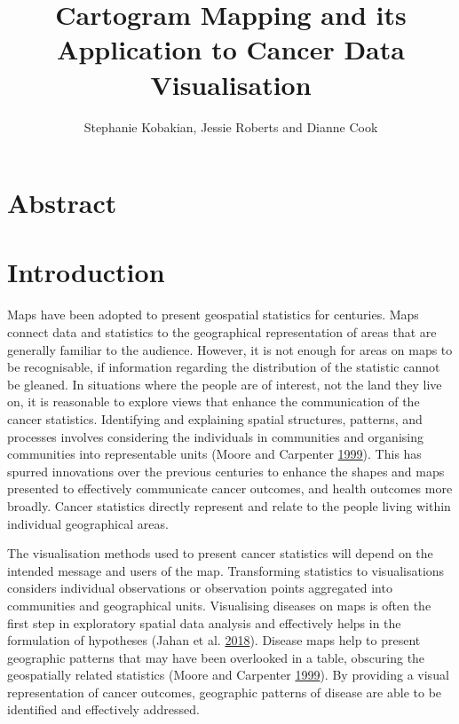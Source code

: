 \documentclass[11pt,]{article}
\title{Cartogram Mapping and its Application to Cancer Data Visualisation}
\author{Stephanie Kobakian, Jessie Roberts and Dianne Cook}
\date{}
\begin{document}
\maketitle

{
\setcounter{tocdepth}{2}
\tableofcontents
}
\section*{Abstract}

\hypertarget{introduction}{%
\section{Introduction}\label{introduction}}

Maps have been adopted to present geospatial statistics for centuries.
Maps connect data and statistics to the geographical representation of
areas that are generally familiar to the audience. However, it is not
enough for areas on maps to be recognisable, if information regarding
the distribution of the statistic cannot be gleaned. In situations where
the people are of interest, not the land they live on, it is reasonable
to explore views that enhance the communication of the cancer
statistics. Identifying and explaining spatial structures, patterns, and
processes involves considering the individuals in communities and
organising communities into representable units (Moore and Carpenter
\protect\hyperlink{ref-SAMGIS}{1999}). This has spurred innovations over
the previous centuries to enhance the shapes and maps presented to
effectively communicate cancer outcomes, and health outcomes more
broadly. Cancer statistics directly represent and relate to the people
living within individual geographical areas.

The visualisation methods used to present cancer statistics will depend
on the intended message and users of the map. Transforming statistics to
visualisations considers individual observations or observation points
aggregated into communities and geographical units. Visualising diseases
on maps is often the first step in exploratory spatial data analysis and
effectively helps in the formulation of hypotheses (Jahan et al.
\protect\hyperlink{ref-MTMSIH}{2018}). Disease maps help to present
geographic patterns that may have been overlooked in a table, obscuring
the geospatially related statistics (Moore and Carpenter
\protect\hyperlink{ref-SAMGIS}{1999}). By providing a visual
representation of cancer outcomes, geographic patterns of disease are
able to be identified and effectively addressed.
\end{document}
